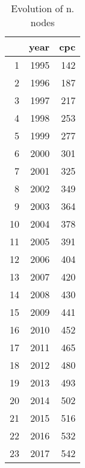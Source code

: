 \begin{table}[ht]
\centering
\begin{tabular}{rrr}
  \hline
 & year & cpc \\ 
  \hline
1 & 1995 &  142 \\ 
  2 & 1996 &  187 \\ 
  3 & 1997 &  217 \\ 
  4 & 1998 &  253 \\ 
  5 & 1999 &  277 \\ 
  6 & 2000 &  301 \\ 
  7 & 2001 &  325 \\ 
  8 & 2002 &  349 \\ 
  9 & 2003 &  364 \\ 
  10 & 2004 &  378 \\ 
  11 & 2005 &  391 \\ 
  12 & 2006 &  404 \\ 
  13 & 2007 &  420 \\ 
  14 & 2008 &  430 \\ 
  15 & 2009 &  441 \\ 
  16 & 2010 &  452 \\ 
  17 & 2011 &  465 \\ 
  18 & 2012 &  480 \\ 
  19 & 2013 &  493 \\ 
  20 & 2014 &  502 \\ 
  21 & 2015 &  516 \\ 
  22 & 2016 &  532 \\ 
  23 & 2017 &  542 \\ 
   \hline
\end{tabular}
\caption{Evolution of n. nodes} 
\end{table}
